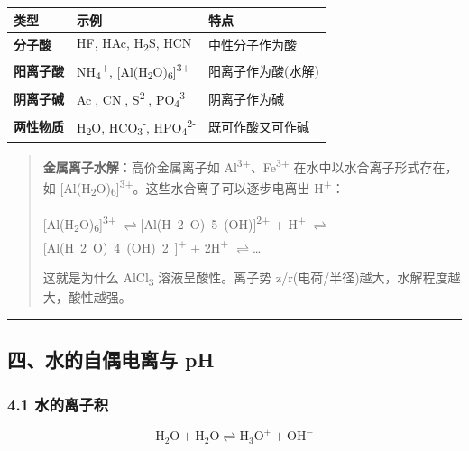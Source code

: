 \documentclass[a4paper,11pt]{ctexart}
\newcounter{none}
\newcommand{\箭}{\ensuremath{\rightarrow}}
\newcommand{\左箭}{\ensuremath{\leftarrow}}
\newcommand{\上箭}{\ensuremath{\uparrow}}
\newcommand{\下箭}{\ensuremath{\downarrow}}
\newcommand{\衡}{\ensuremath{\rightleftharpoons}}
\newcommand{\双箭}{\ensuremath{\leftrightarrow}}
\newcommand{\约等于}{\ensuremath{\approx}}
\newcommand{\小于等于}{\ensuremath{\leq}}
\newcommand{\大于等于}{\ensuremath{\geq}}
\newcommand{\不等于}{\ensuremath{\neq}}
\newcommand{\西格马}{\ensuremath{\sigma}}
\newcommand{\派}{\ensuremath{\pi}}
\begin{document}
{\def\LTcaptype{none} %
\begin{longtable}[]{@{}lll@{}}
\toprule\noalign{}
类型 & 示例 & 特点 \\
\midrule\noalign{}
\endhead
\bottomrule\noalign{}
\endlastfoot
\textbf{分子酸} & HF, HAc, H\textsubscript{2}S, HCN & 中性分子作为酸 \\
\textbf{阳离子酸} & NH\textsubscript{4}\textsuperscript{+}, {[}Al(H\textsubscript{2}O)\textsubscript{6}{]}\textsuperscript{3+} & 阳离子作为酸(水解) \\
\textbf{阴离子碱} & Ac\textsuperscript{-}, CN\textsuperscript{-}, S\textsuperscript{2-}, PO\textsubscript{4}\textsuperscript{3-} & 阴离子作为碱 \\
\textbf{两性物质} & H\textsubscript{2}O, HCO\textsubscript{3}\textsuperscript{-}, HPO\textsubscript{4}\textsuperscript{2-} & 既可作酸又可作碱 \\
\end{longtable}
}

\begin{quote}
\textbf{金属离子水解}：高价金属离子如 Al\textsuperscript{3+}、Fe\textsuperscript{3+} 在水中以水合离子形式存在，如 {[}Al(H\textsubscript{2}O)\textsubscript{6}{]}\textsuperscript{3+}。这些水合离子可以逐步电离出 H\textsuperscript{+}：

{[}Al(H\textsubscript{2}O)\textsubscript{6}{]}\textsuperscript{3+} \衡 [Al(H~2~O)~5~(OH)]\textsuperscript{2+} + H\textsuperscript{+} \衡 [Al(H~2~O)~4~(OH)~2~]\textsuperscript{+} + 2H\textsuperscript{+} \衡 \ldots{}

这就是为什么 AlCl\textsubscript{3} 溶液呈酸性。离子势 z/r(电荷/半径)越大，水解程度越大，酸性越强。
\end{quote}

\begin{center}\rule{0.5\linewidth}{0.5pt}\end{center}

\subsection{四、水的自偶电离与 pH}\label{ux56dbux6c34ux7684ux81eaux5076ux7535ux79bbux4e0e-ph}

\subsubsection{4.1 水的离子积}\label{ux6c34ux7684ux79bbux5b50ux79ef}

\[
\mathrm{H_2O + H_2O \rightleftharpoons H_3O^+ + OH^-}
\]
\end{document}

